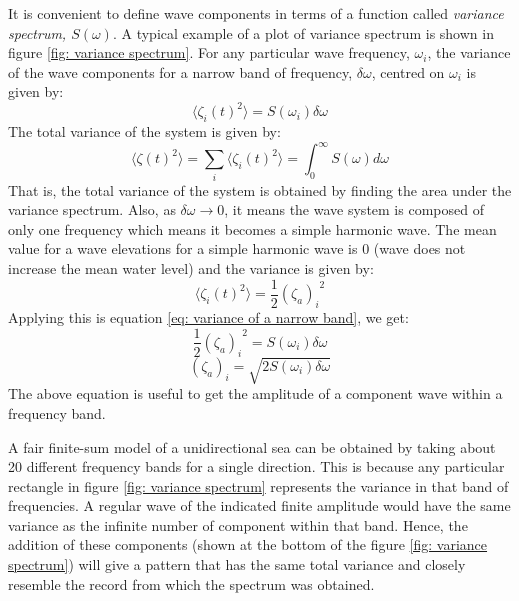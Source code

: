 It is convenient to define wave components in terms of a function called 
\textit{variance spectrum, $S(\omega)$}. A typical example of a plot of variance
spectrum is shown in figure \ref{fig: variance spectrum}. For any particular 
wave frequency, $\omega_i$, the variance of the wave components for a narrow 
band of frequency, $\delta \omega$, centred on $\omega_i$ is given by:
\begin{equation}
  \langle \zeta_i (t)^2 \rangle = S(\omega_i) \delta \omega
  \label{eq: variance of a narrow band}
\end{equation}
The total variance of the system is given by:
\begin{equation}
  \langle \zeta (t)^2 \rangle = \sum _{i} \langle \zeta_i (t)^2 \rangle = 
  \int _{0}^{\infty} S(\omega) d\omega
\end{equation}
That is, the total variance of the system is obtained by finding the area under
the variance spectrum. Also, as $\delta \omega \to 0$, it means the wave system
is composed of only one frequency which means it becomes a simple harmonic wave. 
The mean value for a wave elevations for a simple harmonic wave is $0$ (wave 
does not increase the mean water level) and the variance is given by:
\begin{equation}
  \langle \zeta_i (t)^2 \rangle = \frac{1}{2} {(\zeta_a)_i }^2
\end{equation}
Applying this is equation \ref{eq: variance of a narrow band}, we get:
\begin{equation}
  \frac{1}{2} {(\zeta_a)_i}^2 = S(\omega_i) \delta \omega
\end{equation}
\begin{equation}
  (\zeta_a)_i = \sqrt{2 S(\omega_i) \delta \omega}
\end{equation}
The above equation is useful to get the amplitude of a component wave within a
frequency band. 

A fair finite-sum model of a unidirectional sea can be obtained by taking about
20 different frequency bands for a single direction. This is because any
particular rectangle in figure \ref{fig: variance spectrum} represents the
variance in that band of frequencies. A regular wave of the indicated finite
amplitude would have the same variance as the infinite number of component
within that band. Hence, the addition of these components (shown at the bottom
of the figure \ref{fig: variance spectrum}) will give a pattern that has the
same total variance and closely resemble the record from which the spectrum was
obtained.

